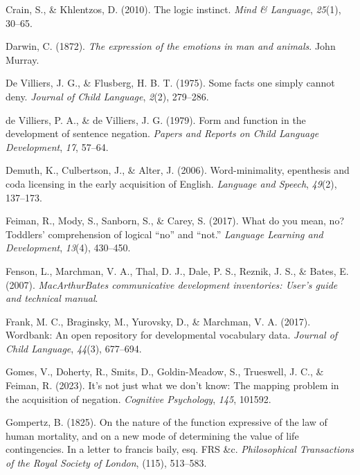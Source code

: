 \documentclass[
  man,floatsintext]{apa6}
\newlength{\cslhangindent}
\newenvironment{CSLReferences}[2] %
 {\begin{list}{}{%
  \setlength{\itemindent}{0pt}
  \setlength{\leftmargin}{0pt}
  \setlength{\parsep}{0pt}
  \ifodd #1
   \setlength{\leftmargin}{\cslhangindent}
   \setlength{\itemindent}{-1\cslhangindent}
  \fi
  \setlength{\itemsep}{#2\baselineskip}}}
 {\end{list}}
\begin{document}
\begin{CSLReferences}{1}{0}
Crain, S., \& Khlentzos, D. (2010). The logic instinct. \emph{Mind \& Language}, \emph{25}(1), 30--65.

Darwin, C. (1872). \emph{The expression of the emotions in man and animals}. John Murray.

De Villiers, J. G., \& Flusberg, H. B. T. (1975). Some facts one simply cannot deny. \emph{Journal of Child Language}, \emph{2}(2), 279--286.

de Villiers, P. A., \& de Villiers, J. G. (1979). Form and function in the development of sentence negation. \emph{Papers and Reports on Child Language Development}, \emph{17}, 57--64.

Demuth, K., Culbertson, J., \& Alter, J. (2006). Word-minimality, epenthesis and coda licensing in the early acquisition of {E}nglish. \emph{Language and Speech}, \emph{49}(2), 137--173.

Feiman, R., Mody, S., Sanborn, S., \& Carey, S. (2017). What do you mean, no? Toddlers' comprehension of logical {``no''} and {``not.''} \emph{Language Learning and Development}, \emph{13}(4), 430--450.

Fenson, L., Marchman, V. A., Thal, D. J., Dale, P. S., Reznik, J. S., \& Bates, E. (2007). \emph{MacArthurBates communicative development inventories: User's guide and technical manual}.

Frank, M. C., Braginsky, M., Yurovsky, D., \& Marchman, V. A. (2017). Wordbank: An open repository for developmental vocabulary data. \emph{Journal of Child Language}, \emph{44}(3), 677--694.

Gomes, V., Doherty, R., Smits, D., Goldin-Meadow, S., Trueswell, J. C., \& Feiman, R. (2023). It's not just what we don't know: The mapping problem in the acquisition of negation. \emph{Cognitive Psychology}, \emph{145}, 101592.

Gompertz, B. (1825). On the nature of the function expressive of the law of human mortality, and on a new mode of determining the value of life contingencies. In a letter to francis baily, esq. FRS \&c. \emph{Philosophical Transactions of the Royal Society of London}, (115), 513--583.


\end{CSLReferences}
\end{document}

